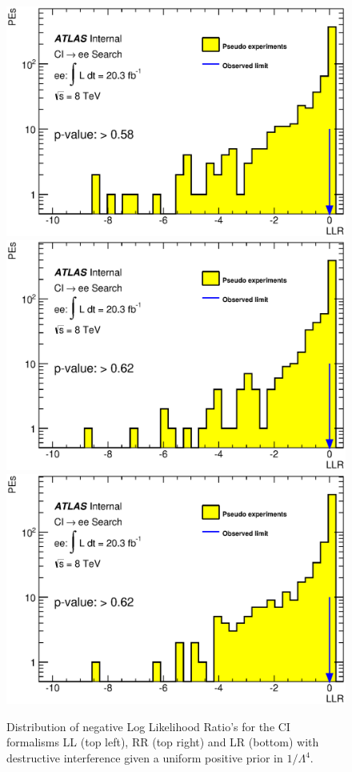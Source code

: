     \begin{figure}[h]
        \begin{center}
            \includegraphics[width=0.42\linewidth]{images/ee__LL_plus_L4/LLR.eps}
            \includegraphics[width=0.42\linewidth]{images/ee__RR_plus_L4/LLR.eps}
            \includegraphics[width=0.42\linewidth]{images/ee__LR_plus_L4/LLR.eps}
        \end{center}
       \caption{Distribution of negative Log Likelihood Ratio's for the CI formalisms LL (top left), RR (top right) and LR (bottom) with destructive interference given a uniform positive prior in $1/\Lambda^{4}$.}
       \label{fig:LLR_CI_des_4}
    \end{figure}
















